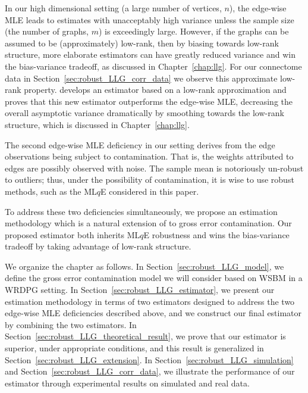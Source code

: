 In our high dimensional setting (a large number of vertices, $n$), the edge-wise MLE leads to estimates with unacceptably high variance unless the sample size (the number of graphs, $m$) is exceedingly large.
However, if the graphs can be assumed to be (approximately) low-rank, then by biasing towards low-rank structure, more elaborate estimators can have greatly reduced variance and win the bias-variance tradeoff, as discussed in Chapter~\ref{chap:llg}.
For our connectome data in Section~\ref{sec:robust_LLG_corr_data} we observe this approximate low-rank property. \citet{tang2016law} develops an estimator based on a low-rank approximation and proves that this new estimator outperforms the edge-wise MLE, decreasing the overall asymptotic variance dramatically by smoothing towards the low-rank structure, which is discussed in Chapter~\ref{chap:llg}.

The second edge-wise MLE deficiency in our setting derives from the edge observations being subject to contamination. That is, the weights attributed to edges are possibly observed with noise.
The sample mean is notoriously un-robust to outliers;
thus, under the possibility of contamination, it is wise to use robust methods, such as the ML$q$E \citep{ferrari2010maximum, qin2013maximum} considered in this paper.

To address these two deficiencies simultaneously, we propose an estimation methodology which is a natural extension of \citep{tang2016law} to gross error contamination. Our proposed estimator both inherits ML$q$E robustness and wins the bias-variance tradeoff by taking advantage of low-rank structure.

We organize the chapter as follows. In Section~\ref{sec:robust_LLG_model}, we define the gross error contamination model we will consider based on WSBM in a WRDPG setting. In Section~\ref{sec:robust_LLG_estimator}, we present our estimation methodology in terms of two estimators designed to address the two edge-wise MLE deficiencies described above, and we construct our final estimator by combining the two estimators. In Section~\ref{sec:robust_LLG_theoretical_result}, we prove that our estimator is superior, under appropriate conditions, and this result is generalized in Section~\ref{sec:robust_LLG_extension}. In Section~\ref{sec:robust_LLG_simulation} and Section~\ref{sec:robust_LLG_corr_data}, we illustrate the performance of our estimator through experimental results on simulated and real data.





